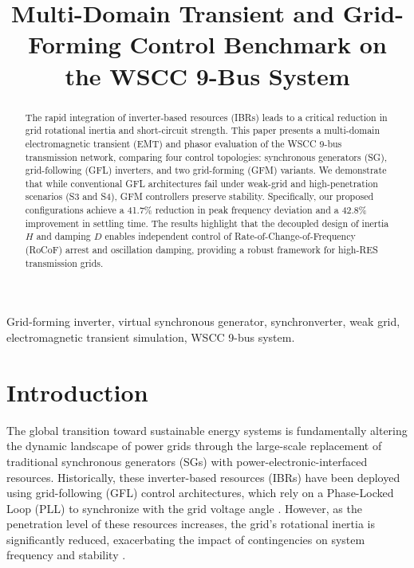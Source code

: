 \documentclass[conference]{IEEEtran}
\begin{document}
\title{Multi-Domain Transient and Grid-Forming Control Benchmark on the WSCC 9-Bus System}

\author{
}

\maketitle

\begin{abstract}
The rapid integration of inverter-based resources (IBRs) leads to a critical reduction in grid rotational inertia and short-circuit strength. This paper presents a multi-domain electromagnetic transient (EMT) and phasor evaluation of the WSCC 9-bus transmission network, comparing four control topologies: synchronous generators (SG), grid-following (GFL) inverters, and two grid-forming (GFM) variants. We demonstrate that while conventional GFL architectures fail under weak-grid and high-penetration scenarios (S3 and S4), GFM controllers preserve stability. Specifically, our proposed configurations achieve a 41.7\% reduction in peak frequency deviation and a 42.8\% improvement in settling time. The results highlight that the decoupled design of inertia $H$ and damping $D$ enables independent control of Rate-of-Change-of-Frequency (RoCoF) arrest and oscillation damping, providing a robust framework for high-RES transmission grids.
\end{abstract}

\begin{IEEEkeywords}
Grid-forming inverter, virtual synchronous generator, synchronverter, weak grid, electromagnetic transient simulation, WSCC 9-bus system.
\end{IEEEkeywords}

\section{Introduction}\label{sec:intro}
The global transition toward sustainable energy systems is fundamentally altering the dynamic landscape of power grids through the large-scale replacement of traditional synchronous generators (SGs) with power-electronic-interfaced resources. Historically, these inverter-based resources (IBRs) have been deployed using grid-following (GFL) control architectures, which rely on a Phase-Locked Loop (PLL) to synchronize with the grid voltage angle \cite{PLL_Sync_Instability}. However, as the penetration level of these resources increases, the grid’s rotational inertia is significantly reduced, exacerbating the impact of contingencies on system frequency and stability \cite{Reduced_Inertia_Impact}.
\end{document}
